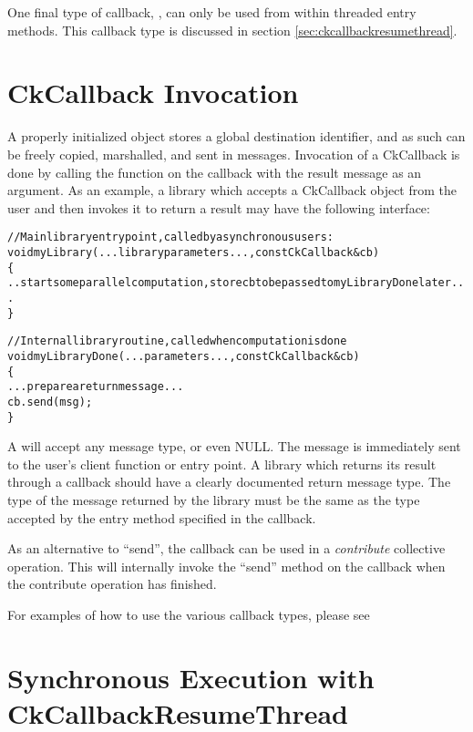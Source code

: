 One final type of callback, , can only be
used from within threaded entry methods.  This callback type is
discussed in section \ref{sec:ckcallbackresumethread}.

\section{CkCallback Invocation}

\label{libraryInterface}

A properly initialized  object stores a global
destination identifier, and as such can be freely copied, marshalled,
and sent in messages. Invocation of a CkCallback is done by calling
the function  on the callback with the result message as an
argument. As an example, a library which accepts a CkCallback object
from the user and then invokes it to return a result may have the
following interface:

\begin{alltt}
//Main library entry point, called by asynchronous users:
void myLibrary(...library parameters...,const CkCallback \&cb) 
\{
  ..start some parallel computation, store cb to be passed to myLibraryDone later...
\}

//Internal library routine, called when computation is done
void myLibraryDone(...parameters...,const CkCallback \&cb)
\{
  ...prepare a return message...
  cb.send(msg);
\}
\end{alltt}

A  will accept any message type, or even NULL.  The
message is immediately sent to the user's client function or entry
point.  A library which returns its result through a callback should
have a clearly documented return message type. The type of the message
returned by the library must be the same as the type accepted by the
entry method specified in the callback. 

As an alternative to ``send'', the callback can be used in a {\em
  contribute} collective operation. This will internally invoke the
``send'' method on the callback when the contribute operation has
finished.

For examples of how to use the various callback types, please
see 

\section{Synchronous Execution with CkCallbackResumeThread}

